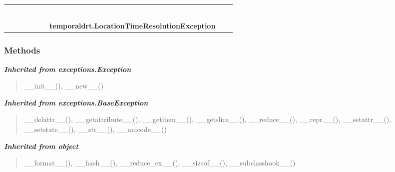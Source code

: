     \label{temporaldrt:LocationTimeResolutionException}
\begin{tabular}{cccccccccc}
\multicolumn{2}{r}{\settowidth{\BCL}{object}\multirow{2}{\BCL}{object}}
&&
&&
&&
  \\\cline{3-3}
  &&\multicolumn{1}{c|}{}
&&
&&
&&
  \\
\multicolumn{4}{r}{\settowidth{\BCL}{exceptions.BaseException}\multirow{2}{\BCL}{exceptions.BaseException}}
&&
&&
  \\\cline{5-5}
  &&&&\multicolumn{1}{c|}{}
&&
&&
  \\
\multicolumn{6}{r}{\settowidth{\BCL}{exceptions.Exception}\multirow{2}{\BCL}{exceptions.Exception}}
&&
  \\\cline{7-7}
  &&&&&&\multicolumn{1}{c|}{}
&&
  \\
&&&&&&\multicolumn{2}{l}{\textbf{temporaldrt.LocationTimeResolutionException}}
\end{tabular}



  \subsubsection{Methods}


\large{\textbf{\textit{Inherited from exceptions.Exception}}}

\begin{quote}
\_\_init\_\_(), \_\_new\_\_()
\end{quote}

\large{\textbf{\textit{Inherited from exceptions.BaseException}}}

\begin{quote}
\_\_delattr\_\_(), \_\_getattribute\_\_(), \_\_getitem\_\_(), \_\_getslice\_\_(), \_\_reduce\_\_(), \_\_repr\_\_(), \_\_setattr\_\_(), \_\_setstate\_\_(), \_\_str\_\_(), \_\_unicode\_\_()
\end{quote}

\large{\textbf{\textit{Inherited from object}}}

\begin{quote}
\_\_format\_\_(), \_\_hash\_\_(), \_\_reduce\_ex\_\_(), \_\_sizeof\_\_(), \_\_subclasshook\_\_()
\end{quote}

